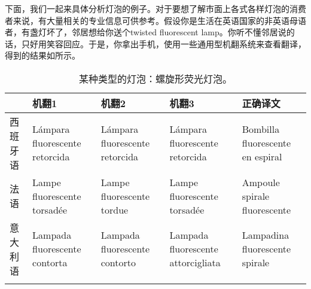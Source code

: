 \documentclass[output=paper]{langscibook}
\begin{document}
下面，我们一起来具体分析灯泡的例子。对于要想了解市面上各式各样灯泡的消费者来说，有大量相关的专业信息可供参考。假设你是生活在英语国家的非英语母语者，有盏灯坏了，邻居想给你送个twisted fluorescent lamp。你听不懂邻居说的话，只好用笑容回应。于是，你拿出手机，使用一些通用型机翻系统来查看翻译，得到的结果如所示。


\begin{table}
\caption{某种类型的灯泡：螺旋形荧光灯泡。}
\label{tab:2:bulb}
\begin{tabularx}{\textwidth}{
p{}
p{}
p{}
p{}
p{}} \lsptoprule
 & {机翻1} & {机翻2} & {机翻3} & {正确译文} \\\midrule 
{西班牙语} & L\'{a}mpara \newline fluorescente \newline retorcida & L\'{a}mpara \newline fluorescente \newline retorcida & L\'{a}mpara \newline fluorescente \newline retorcida & Bombilla \newline fluorescente \newline en espiral \\ \midrule 
{法语} & Lampe \newline fluorescente \newline torsad\'{e}e & Lampe \newline fluorescente \newline tordue & Lampe \newline fluorescente \newline torsad\'{e}e & Ampoule \newline spirale \newline fluorescente \\\midrule
{意大利语} & Lampada \newline fluorescente \newline contorta & Lampada \newline fluorescente \newline contorto & Lampada \newline fluorescente \newline attorcigliata & Lampadina \newline fluorescente \newline spirale \\\lspbottomrule 
\end{tabularx}
\end{table}
\end{document}
